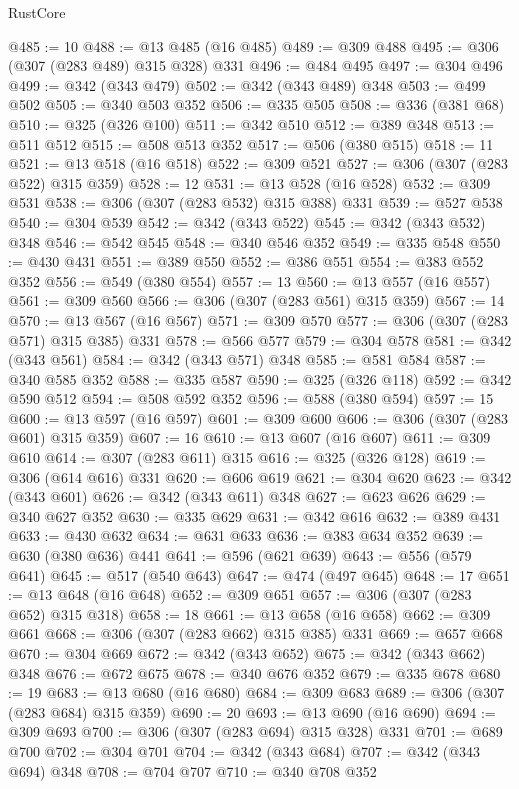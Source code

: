 \begin{lexlean}{RustCore}
\begin{coremodule}
@485 := 10
@488 := @13 @485 (@16 @485)
@489 := @309 @488
@495 := @306 (@307 (@283 @489) @315 @328) @331
@496 := @484 @495
@497 := @304 @496
@499 := @342 (@343 @479)
@502 := @342 (@343 @489) @348
@503 := @499 @502
@505 := @340 @503 @352
@506 := @335 @505
@508 := @336 (@381 @68)
@510 := @325 (@326 @100)
@511 := @342 @510
@512 := @389 @348
@513 := @511 @512
@515 := @508 @513 @352
@517 := @506 (@380 @515)
@518 := 11
@521 := @13 @518 (@16 @518)
@522 := @309 @521
@527 := @306 (@307 (@283 @522) @315 @359)
@528 := 12
@531 := @13 @528 (@16 @528)
@532 := @309 @531
@538 := @306 (@307 (@283 @532) @315 @388) @331
@539 := @527 @538
@540 := @304 @539
@542 := @342 (@343 @522)
@545 := @342 (@343 @532) @348
@546 := @542 @545
@548 := @340 @546 @352
@549 := @335 @548
@550 := @430 @431
@551 := @389 @550
@552 := @386 @551
@554 := @383 @552 @352
@556 := @549 (@380 @554)
@557 := 13
@560 := @13 @557 (@16 @557)
@561 := @309 @560
@566 := @306 (@307 (@283 @561) @315 @359)
@567 := 14
@570 := @13 @567 (@16 @567)
@571 := @309 @570
@577 := @306 (@307 (@283 @571) @315 @385) @331
@578 := @566 @577
@579 := @304 @578
@581 := @342 (@343 @561)
@584 := @342 (@343 @571) @348
@585 := @581 @584
@587 := @340 @585 @352
@588 := @335 @587
@590 := @325 (@326 @118)
@592 := @342 @590 @512
@594 := @508 @592 @352
@596 := @588 (@380 @594)
@597 := 15
@600 := @13 @597 (@16 @597)
@601 := @309 @600
@606 := @306 (@307 (@283 @601) @315 @359)
@607 := 16
@610 := @13 @607 (@16 @607)
@611 := @309 @610
@614 := @307 (@283 @611) @315
@616 := @325 (@326 @128)
@619 := @306 (@614 @616) @331
@620 := @606 @619
@621 := @304 @620
@623 := @342 (@343 @601)
@626 := @342 (@343 @611) @348
@627 := @623 @626
@629 := @340 @627 @352
@630 := @335 @629
@631 := @342 @616
@632 := @389 @431
@633 := @430 @632
@634 := @631 @633
@636 := @383 @634 @352
@639 := @630 (@380 @636) @441
@641 := @596 (@621 @639)
@643 := @556 (@579 @641)
@645 := @517 (@540 @643)
@647 := @474 (@497 @645)
@648 := 17
@651 := @13 @648 (@16 @648)
@652 := @309 @651
@657 := @306 (@307 (@283 @652) @315 @318)
@658 := 18
@661 := @13 @658 (@16 @658)
@662 := @309 @661
@668 := @306 (@307 (@283 @662) @315 @385) @331
@669 := @657 @668
@670 := @304 @669
@672 := @342 (@343 @652)
@675 := @342 (@343 @662) @348
@676 := @672 @675
@678 := @340 @676 @352
@679 := @335 @678
@680 := 19
@683 := @13 @680 (@16 @680)
@684 := @309 @683
@689 := @306 (@307 (@283 @684) @315 @359)
@690 := 20
@693 := @13 @690 (@16 @690)
@694 := @309 @693
@700 := @306 (@307 (@283 @694) @315 @328) @331
@701 := @689 @700
@702 := @304 @701
@704 := @342 (@343 @684)
@707 := @342 (@343 @694) @348
@708 := @704 @707
@710 := @340 @708 @352

\end{coremodule}
\end{lexlean}
